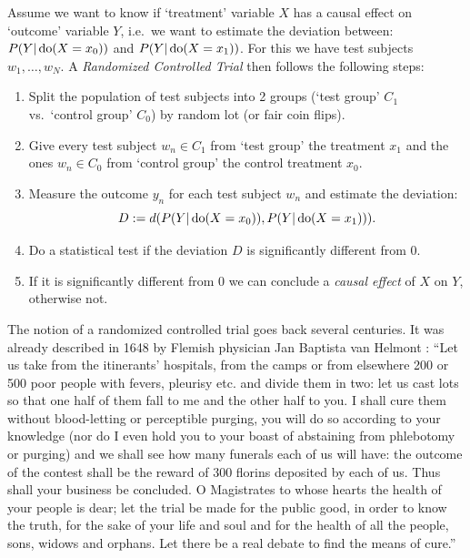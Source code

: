 \begin{Prn}\label{prn:rct}
 Assume we want to know if `treatment' variable $X$ has a causal effect on `outcome' variable $Y$, i.e.\ we want to estimate the deviation between:
$ P(Y|\operatorname{do}(X=x_0))$ and  $P(Y|\operatorname{do}(X=x_1))$. For this we have test subjects $w_1,\dots,w_N$.
A \emph{Randomized Controlled Trial} then follows the following steps:
\begin{enumerate}
    \item Split the population of test subjects into 2 groups (`test group' $C_1$ vs.\ `control group' $C_0$) by random lot (or fair coin flips).
    \item Give every test subject $w_n \in C_1$ from `test group' the treatment $x_1$ and the ones  $w_n \in C_0$ from `control group' the control treatment $x_0$.
    \item Measure the outcome $y_n$ for each test subject $w_n$ and estimate the deviation: \[D:=d(P(Y|\operatorname{do}(X=x_0)),P(Y|\operatorname{do}(X=x_1))).\]
    \item Do a statistical test if the deviation $D$ is significantly different from $0$. 
    \item If it is significantly different from 0 we can conclude a \emph{causal effect} of $X$ on $Y$, otherwise not.
\end{enumerate}
\end{Prn}

\begin{Rem}
  The notion of a randomized controlled trial goes back several centuries. It was already described in 1648 by Flemish physician Jan Baptista van Helmont \cite{vanHelmont1648}:
  ``Let us take from the itinerants' hospitals, from the camps or from elsewhere 200 or 500 poor people with fevers, pleurisy etc. and divide them in two: let us cast lots so that one half of them fall to me and the other half to you. I shall cure them without blood-letting or perceptible purging, you will do so according to your knowledge (nor do I even hold you to your boast of abstaining from phlebotomy or purging) and we shall see how many funerals each of us will have: the outcome of the contest shall be the reward of 300 florins deposited by each of us. Thus shall your business be concluded. O Magistrates to whose hearts the health of your people is dear; let the trial be made for the public good, in order to know the truth, for the sake of your life and soul and for the health of all the people, sons, widows and orphans. Let there be a real debate to find the means of cure.''
\end{Rem}

